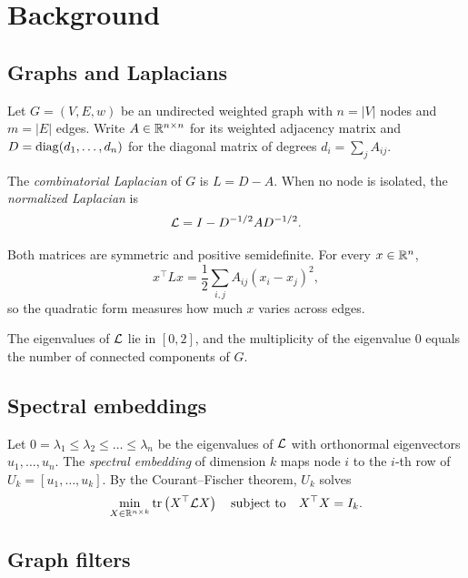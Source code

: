\chapter{Background}
\label{ch:background}

\section{Graphs and Laplacians}

Let $G = (V, E, w)$ be an undirected weighted graph with $n = |V|$ nodes and $m = |E|$ edges. Write $A \in \mathbb{R}^{n \times n}$ for its weighted adjacency matrix and $D = \operatorname{diag}(d_1, \dots, d_n)$ for the diagonal matrix of degrees $d_i = \sum_j A_{ij}$.

\begin{definition}
The \emph{combinatorial Laplacian} of $G$ is $L = D - A$. When no node is isolated, the \emph{normalized Laplacian} is
\begin{equation}
  \mathcal{L} = I - D^{-1/2} A D^{-1/2}.
  \label{eq:normalized-laplacian}
\end{equation}
\end{definition}

Both matrices are symmetric and positive semidefinite. For every $x \in \mathbb{R}^n$,
\begin{equation}
  x^\top L x = \frac{1}{2} \sum_{i,j} A_{ij} (x_i - x_j)^2,
  \label{eq:quadratic-form}
\end{equation}
so the quadratic form measures how much $x$ varies across edges.

\begin{proposition}
The eigenvalues of $\mathcal{L}$ lie in $[0, 2]$, and the multiplicity of the eigenvalue $0$ equals the number of connected components of $G$.
\end{proposition}

\section{Spectral embeddings}

Let $0 = \lambda_1 \le \lambda_2 \le \dots \le \lambda_n$ be the eigenvalues of $\mathcal{L}$ with orthonormal eigenvectors $u_1, \dots, u_n$. The \emph{spectral embedding} of dimension $k$ maps node $i$ to the $i$-th row of $U_k = [u_1, \dots, u_k]$. By the Courant--Fischer theorem, $U_k$ solves
\[
  \min_{X \in \mathbb{R}^{n \times k}} \operatorname{tr}\left( X^\top \mathcal{L} X \right) \quad \text{subject to} \quad X^\top X = I_k .
\]

\section{Graph filters}

